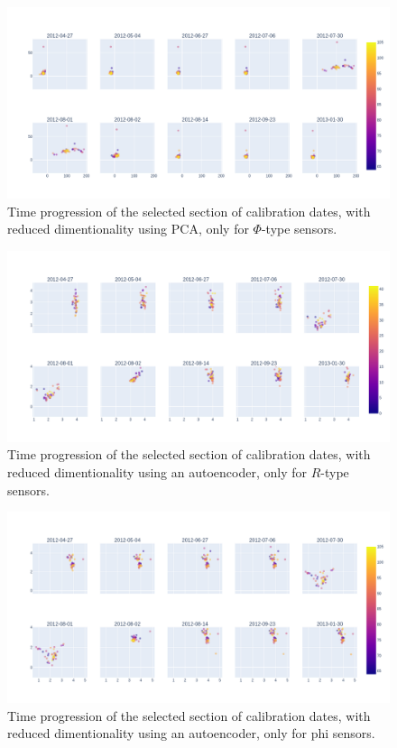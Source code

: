 \begin{figure}[H]
    \centering
    \includegraphics[width=\linewidth]{figures/chapter4/dimred/PCA_module_phi_together.png}
    \caption{Time progression of the selected section of calibration dates, with reduced dimentionality using PCA, only for $\Phi$-type sensors.}
   \label{plot:pca_progression_r}
  \end{figure}

\begin{figure}[H]
    \centering
    \includegraphics[width=\linewidth]{figures/chapter4/dimred/NN_module_R_together.png}
    \caption{Time progression of the selected section of calibration dates, with reduced dimentionality using an autoencoder, only for $R$-type sensors.}
   \label{plot:nn_progression_r}
  \end{figure}

\begin{figure}[H]
    \centering
    \includegraphics[width=\linewidth]{figures/chapter4/dimred/NN_module_phi_together.png}
    \caption{Time progression of the selected section of calibration dates, with reduced dimentionality using an autoencoder, only for phi sensors.}
   \label{plot:nn_progression_phi}
  \end{figure}

